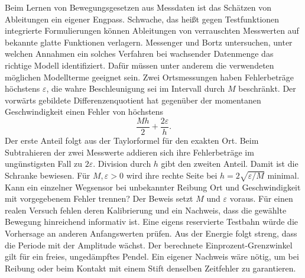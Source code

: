 Beim Lernen von Bewegungsgesetzen aus Messdaten ist das Schätzen von Ableitungen ein eigener Engpass. Schwache, das heißt gegen Testfunktionen integrierte Formulierungen können Ableitungen von verrauschten Messwerten auf bekannte glatte Funktionen verlagern. Messenger und Bortz untersuchen, unter welchen Annahmen ein solches Verfahren bei wachsender Datenmenge das richtige Modell identifiziert. Dafür müssen unter anderem die verwendeten möglichen Modellterme geeignet sein.
Zwei Ortsmessungen haben Fehlerbeträge höchstens \(\varepsilon\), die wahre Beschleunigung sei im Intervall durch \(M\) beschränkt. Der vorwärts gebildete Differenzenquotient hat gegenüber der momentanen Geschwindigkeit einen Fehler von höchstens
\[
 \frac{M h}{2}+\frac{2\varepsilon}{h}.
\]
Der erste Anteil folgt aus der Taylorformel für den exakten Ort. Beim Subtrahieren der zwei Messwerte addieren sich ihre Fehlerbeträge im ungünstigsten Fall zu \(2\varepsilon\). Division durch \(h\) gibt den zweiten Anteil. Damit ist die Schranke bewiesen. Für \(M,\varepsilon>0\) wird ihre rechte Seite bei \(h=2\sqrt{\varepsilon/M}\) minimal.
Kann ein einzelner Wegsensor bei unbekannter Reibung Ort und Geschwindigkeit mit vorgegebenem Fehler trennen? Der Beweis setzt \(M\) und \(\varepsilon\) voraus. Für einen realen Versuch fehlen deren Kalibrierung und ein Nachweis, dass die gewählte Bewegung hinreichend informativ ist. Eine eigens reservierte Testbahn würde die Vorhersage an anderen Anfangswerten prüfen.
Aus der Energie folgt streng, dass die Periode mit der Amplitude wächst. Der berechnete Einprozent-Grenzwinkel gilt für ein freies, ungedämpftes Pendel. Ein eigener Nachweis wäre nötig, um bei Reibung oder beim Kontakt mit einem Stift denselben Zeitfehler zu garantieren.


